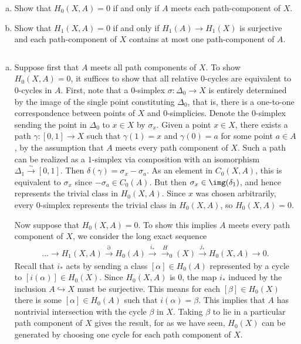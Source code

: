 \begin{homework}[e]
  $ $
  \begin{enumerate}[(a)]
    \item Show that $H_0(X,A) = 0$ if and only if $A$ meets each path-component of $X$.
    \item Show that $H_1(X,A) = 0$ if and only if $H_1(A) \to H_1(X)$ is surjective and each path-component of $X$ contains at most one path-component of $A$.
  \end{enumerate}
  \begin{prf}$ $
    \begin{enumerate}[(a)]
      \item Suppose first that $A$ meets all path components of $X$. To show $H_0(X,A) = 0$, it suffices to show that all relative $0$-cycles are equivalent to $0$-cycles in $A$. First, note that a $0$-simplex $\sigma:\Delta_0\to X$ is entirely determined by the image of the single point constituting $\Delta_0$, that is, there is a one-to-one correspondence between points of $X$ and $0$-simplicies. Denote the $0$-simplex sending the point in $\Delta_0$ to $x \in X$ by $\sigma_x$. Given a point $x\in X$, there exists a path $\gamma:[0,1]\to X$ such that $\gamma(1) = x$ and $\gamma(0) = a$ for some point $a \in A$, by the assumption that $A$ meets every path component of $X$. Such a path can be realized as a $1$-simplex via composition with an isomorphism $\Delta_1\xrightarrow{\sim} [0,1]$. Then $\delta(\gamma) = \sigma_x - \sigma_a$. As an element in $C_0(X,A)$, this is equivalent to $\sigma_x$ since $-\sigma_a \in C_0(A)$. But then $\sigma_x \in \img(\delta_1)$, and hence represents the trivial class in $H_0(X,A)$. Since $x$ was chosen arbitrarily, every $0$-simplex represents the trivial class in $H_0(X,A)$, so $H_0(X,A) = 0$.

        Now suppose that $H_0(X,A) = 0$. To show this implies $A$ meets every path component of $X$, we consider the long exact sequence
        \begin{align*}
          ... \to H_1(X,A) \xrightarrow{\partial} H_0(A) \xrightarrow{i_*} \xrightarrow H_0(X) \xrightarrow{j_*} H_0(X,A) \to 0.
        \end{align*}
        Recall that $i_*$ acts by sending a class $[\alpha] \in H_0(A)$ represented by a cycle to $[i(\alpha)] \in H_0(X)$. Since $H_0(X,A)$ is $0$, the map $i_*$ induced by the inclusion $A\hookrightarrow X$ must be surjective. This means for each $[\beta]\in H_0(X)$ there is some $[\alpha]\in H_0(A)$ such that $i(\alpha) = \beta$. This implies that $A$ has nontrivial intersection with the cycle $\beta$ in $X$. Taking $\beta$ to lie in a particular path component of $X$ gives the result, for as we have seen, $H_0(X)$ can be generated by choosing one cycle for each path component of $X$.


\end{enumerate}
\end{prf}
\end{homework}

